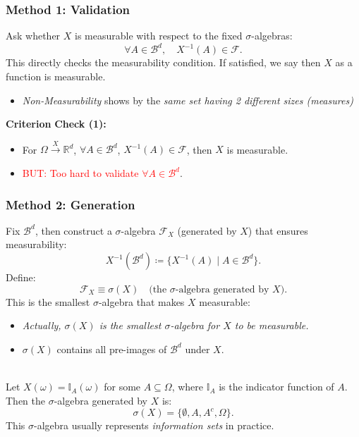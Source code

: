 \subsubsection{Method 1: Validation}

Ask whether \( X \) is measurable with respect to the fixed \(\sigma\)-algebras:
\[
\forall A \in \mathscr{B}^d, \quad X^{-1}(A) \in \mathscr{F}.
\]
\noindent This directly checks the measurability condition. If satisfied, we say then \( X \) as a function is measurable.

\begin{itemize}
    \item \textit{Non-Measurability} shows by the \textit{same set having 2 different sizes (measures)}
\end{itemize}

\textbf{Criterion}
\textbf{Check (1):}
\begin{itemize}
    \item For \( \Omega \xrightarrow{X} \mathbb{R}^d \), \( \forall A \in \mathscr{B}^d \), \( X^{-1}(A) \in \mathscr{F} \), then \( X \) is measurable.
    \item \textcolor{red}{BUT: Too hard to validate \( \forall A \in \mathscr{B}^d \)}.
\end{itemize}

\subsubsection{Method 2: Generation}
Fix \(\mathscr{B}^d\), then construct a \(\sigma\)-algebra \(\mathscr{F}_X\) (generated by \(X\)) that ensures measurability:
\[
X^{-1}(\mathscr{B}^d) \coloneqq \{X^{-1}(A) \mid A \in \mathscr{B}^d\}.
\]
Define:
\[
\mathscr{F}_X \equiv \sigma(X) \quad \text{(the \(\sigma\)-algebra generated by \(X\))}.
\]
\noindent This is the smallest \(\sigma\)-algebra that makes \(X\) measurable:
\begin{itemize}
    \item \textit{Actually, \(\sigma(X)\) is the smallest \(\sigma\)-algebra for \(X\) to be measurable.}
    \item \(\sigma(X)\) contains all pre-images of \(\mathscr{B}^d\) under \(X\).
\end{itemize}

\begin{eg}{}\\
Let \( X(\omega) = \mathbb{I}_A(\omega) \) for some \( A \subseteq \Omega \), where \( \mathbb{I}_A \) is the indicator function of \( A \). Then the \(\sigma\)-algebra generated by \( X \) is:
\[
\sigma(X) = \{\emptyset, A, A^c, \Omega \}.
\]
This \(\sigma\)-algebra usually represents \textit{information sets} in practice.
\end{eg}

